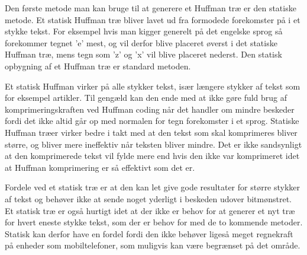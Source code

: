 Den første metode man kan bruge til at generere et Huffman træ er den statiske metode. Et statisk Huffman træ bliver lavet ud fra formodede forekomster på i et stykke tekst. For eksempel hvis man kigger generelt på det engelske sprog så forekommer tegnet ’e’ mest, og vil derfor blive placeret øverst i det statiske Huffman træ, mens tegn som ’z’ og ’x’ vil blive placeret nederst. Den statisk opbygning af et Huffman træ er standard metoden\cite{Hufftree_2}.

Et statisk Huffman virker på alle stykker tekst, især længere stykker af tekst som for eksempel artikler. Til gengæld kan den ende med at ikke gøre fuld brug af komprimeringskraften ved Huffman coding når det handler om mindre beskeder fordi det ikke altid går op med normalen for tegn forekomster i et sprog. Statiske Huffman træer virker bedre i takt med at den tekst som skal komprimeres bliver større, og bliver mere ineffektiv når teksten bliver mindre. Det er ikke sandsynligt at den komprimerede tekst vil fylde mere end hvis den ikke var komprimeret idet at Huffman komprimering er så effektivt som det er. \cite{Hufftree_3}

Fordele ved et statisk træ er at den kan let give gode resultater for større stykker af tekst og behøver ikke at sende noget yderligt i beskeden udover bitmønstret. Et statisk træ er også hurtigt idet at der ikke er behov for at generer et nyt træ for hvert eneste stykke tekst, som der er behov for med de to kommende metoder. Statisk kan derfor have en fordel fordi den ikke behøver ligeså meget regnekraft på enheder som mobiltelefoner, som muligvis kan være begrænset på det område.
